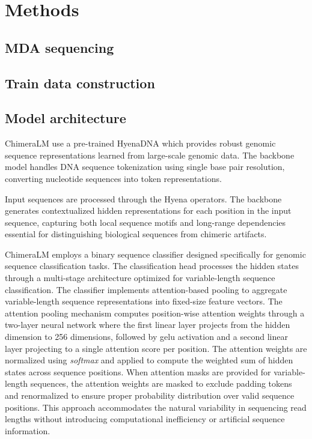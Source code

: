 \documentclass[pdflatex,sn-nature]{sn-jnl}%
\theoremstyle{thmstyleone}%
\theoremstyle{thmstyletwo}%
\theoremstyle{thmstylethree}%
\begin{document}
\section*{Methods}\label{sec:methods}

\subsection*{MDA sequencing}

\subsection*{Train data construction}

\subsection*{Model architecture}

ChimeraLM use a pre-trained HyenaDNA which provides robust genomic sequence representations learned from large-scale genomic data.
The backbone model handles DNA sequence tokenization using single base pair resolution, converting nucleotide sequences into token representations.

Input sequences are processed through the Hyena operators.
The backbone generates contextualized hidden representations for each position in the input sequence, capturing both local sequence motifs and long-range dependencies essential for distinguishing biological sequences from chimeric artifacts.

ChimeraLM employs a binary sequence classifier designed specifically for genomic sequence classification tasks.
The classification head processes the hidden states through a multi-stage architecture optimized for variable-length sequence classification.
The classifier implements attention-based pooling to aggregate variable-length sequence representations into fixed-size feature vectors.
The attention pooling mechanism computes position-wise attention weights through a two-layer neural network where the first linear layer projects from the hidden dimension to 256 dimensions, followed by \gls{gelu} activation and a second linear layer projecting to a single attention score per position.
The attention weights are normalized using \emph{softmax} and applied to compute the weighted sum of hidden states across sequence positions.
When attention masks are provided for variable-length sequences, the attention weights are masked to exclude padding tokens and renormalized to ensure proper probability distribution over valid sequence positions.
This approach accommodates the natural variability in sequencing read lengths without introducing computational inefficiency or artificial sequence information.
\end{document}
